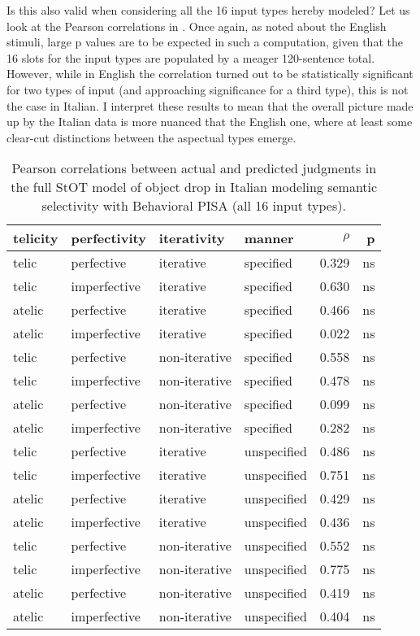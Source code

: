Is this also valid when considering all the 16 input types hereby modeled? Let us look at the Pearson correlations in . Once again, as noted about the English stimuli, large p values are to be expected in such a computation, given that the 16 slots for the input types are populated by a meager 120-sentence total. However, while in English the correlation turned out to be statistically significant for two types of input (and approaching significance for a third type), this is not the case in Italian. I interpret these results to mean that the overall picture made up by the Italian data is more nuanced that the English one, where at least some clear-cut distinctions between the aspectual types emerge.

\begin{table}[htb] %
\caption{Pearson correlations between actual and predicted judgments in the full StOT model of object drop in Italian modeling semantic selectivity with Behavioral PISA (all 16 input types).}
\begin{tabular}{llll|rr}
\textbf{telicity} & \textbf{perfectivity} & \textbf{iterativity} & \textbf{manner} & \textbf{$\rho$} & \textbf{p} \\
\hline
telic    & perfective   & iterative     & specified             & 0.329 & ns \\
telic    & imperfective       & iterative     & specified       & 0.630 & ns \\
atelic   & perfective   & iterative     & specified             & 0.466 & ns \\
atelic   & imperfective       & iterative     & specified       & 0.022 & ns \\
telic    & perfective   & non-iterative & specified             & 0.558 & ns \\
telic    & imperfective       & non-iterative & specified       & 0.478 & ns \\
atelic   & perfective   & non-iterative & specified             & 0.099 & ns \\
atelic   & imperfective       & non-iterative & specified       & 0.282 & ns \\
telic    & perfective   & iterative     & unspecified           & 0.486 & ns \\
telic    & imperfective      & iterative     & unspecified      & 0.751 & ns \\
atelic   & perfective   & iterative     & unspecified           & 0.429 & ns \\
atelic   & imperfective       & iterative     & unspecified     & 0.436 & ns \\
telic    & perfective   & non-iterative & unspecified           & 0.552 & ns \\
telic    & imperfective       & non-iterative & unspecified     & 0.775 & ns \\
atelic   & perfective         & non-iterative & unspecified     & 0.419 & ns \\
atelic   & imperfective   & non-iterative & unspecified         & 0.404 & ns
\end{tabular}
\end{table}

